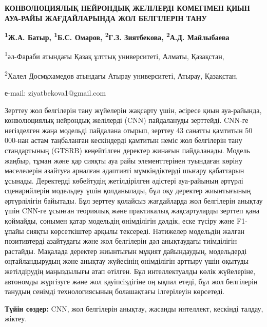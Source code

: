\begin{center}
{\large\bfseries КОНВОЛЮЦИЯЛЫҚ НЕЙРОНДЫҚ ЖЕЛІЛЕРДІ КӨМЕГІМЕН ҚИЫН АУА-РАЙЫ
ЖАҒДАЙЛАРЫНДА ЖОЛ БЕЛГІЛЕРІН ТАНУ}

{\bfseries \textsuperscript{1}Ж.А. Батыр, \textsuperscript{1}Б.С. Омаров,
\textsuperscript{2}Г.З. Зиятбекова\envelope, \textsuperscript{2}А.Д. Майлыбаева}

\textsuperscript{1}әл-Фараби атындағы Қазақ ұлттық университеті, Алматы,
Қазақстан,

\textsuperscript{2}Халел Досмұхамедов атындағы Атырау университеті,
Атырау, Қазақстан,

е-mail: ziyatbekova1@gmail.com
\end{center}

Зерттеу жол белгілерін тану жүйелерін жақсарту үшін, әсіресе қиын
ауа-райында, конволюциялық нейрондық желілерді (CNN) пайдалануды
зерттейді. CNN-ге негізделген жаңа модельді пайдалана отырып, зерттеу 43
санатты қамтитын 50 000-нан астам таңбаланған кескіндерді қамтитын неміс
жол белгілерін тану стандартының (GTSRB) кеңейтілген деректер жинағын
пайдаланады. Модель жаңбыр, тұман және қар сияқты ауа райы
элементтерінен туындаған көріну мәселелерін азайтуға арналған адаптивті
мүмкіндіктерді шығару қабаттарын ұсынады. Деректерді көбейтудің
жетілдірілген әдістері ауа-райының әртүрлі сценарийлерін модельдеу үшін
қолданылады, бұл оқу деректер жиынтығының әртүрлілігін байытады. Бұл
зерттеу қолайсыз жағдайларда жол белгілерін анықтау үшін CNN-ге ұсынған
теориялық және практикалық жақсартуларды зерттеп қана қоймайды, сонымен
қатар модельдің өнімділігін дәлдік, еске түсіру және F1-ұпайы сияқты
көрсеткіштер арқылы тексереді. Нәтижелер модельдің жалған позитивтерді
азайтудағы және жол белгілерін дәл анықтаудағы тиімділігін растайды.
Мақалада деректер жиынтығын мұқият дайындаудың, модельдерді
оңтайландырудың және анықтау жүйесінің өнімділігін арттыру үшін оқытуды
жетілдірудің маңыздылығы атап өтілген. Бұл интеллектуалды көлік
жүйелеріне, автономды жүргізуге және жол қауіпсіздігіне оң ықпал етеді,
бұл жол белгілерін танудың сенімді технологиясының болашақтағы
ілгерілеуін көрсетеді.

{\bfseries Түйін сөздер:} CNN, жол белгілерін анықтау, жасанды интеллект,
кескінді талдау, жіктеу.

